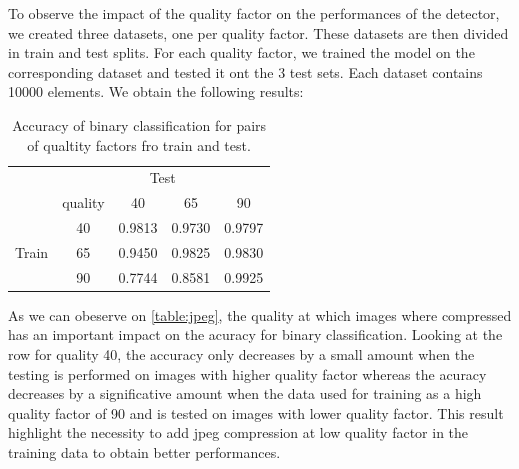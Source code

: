 \documentclass[12pt,a4paper]{article}
\begin{document}
To observe the impact of the quality factor on the performances of the detector, we created three datasets, one per quality factor. These datasets are then divided in train and test splits. For each quality factor, we trained the model on the corresponding dataset and tested it ont the 3 test sets. Each dataset contains 10000 elements. We obtain the following results:
\begin{table}[H]
    \centering
    \begin{tabular}{|c|c|c|c|c|}
    \hline
    & \multicolumn{4}{c|}{Test} \\
    \cline{2-5}
     & quality & 40 & 65 & 90 \\
    \hline
    \multirow{3}{*}{Train} & 40 & 0.9813 & 0.9730 & 0.9797 \\
     \cline{2-5}
     & 65 & 0.9450 & 0.9825 & 0.9830 \\
     \cline{2-5}
     & 90 & 0.7744 & 0.8581 & 0.9925 \\
    \hline
    \end{tabular}
    \caption{Accuracy of binary classification for pairs of qualtity factors fro train and test.}
    \label{table:jpeg}
\end{table}

As we can obeserve on \autoref*{table:jpeg}, the quality at which images where compressed has an important impact on the acuracy for binary classification. Looking at the row for quality 40, the accuracy only decreases by a small amount when the testing is performed on images with higher quality factor whereas the acuracy decreases by a significative amount when the data used for training as a high quality factor of 90 and is tested on images with lower quality factor. This result highlight the necessity to add jpeg compression at low quality factor in the training data to obtain better performances.
\end{document}
